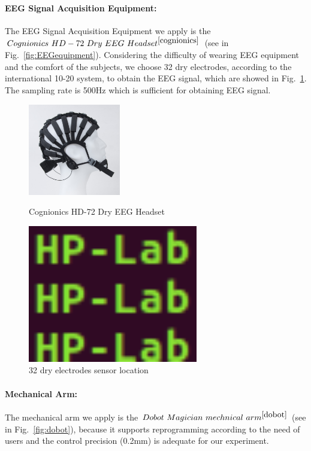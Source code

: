 \documentclass[runningheads,a4paper]{llncs}
\begin{document}
\paragraph{EEG Signal Acquisition Equipment:}
The EEG Signal Acquisition Equipment we apply is the $Cognionics\ HD-72\ Dry\ EEG
\ Headset^{\cite{cognionics}}$ (see in Fig.~\ref{fig:EEGequipment}).
Considering the difficulty of wearing EEG equipment and the comfort of the subjects,
we choose 32 dry electrodes, according to the international 10-20 system,
to obtain the EEG signal, which are showed in Fig.~\ref{fig:sensorloc}.
The sampling rate is 500Hz which is sufficient for obtaining EEG signal.
\begin{figure}
    \centering
    \includegraphics[height=4cm]{images/1}
    \caption{Cognionics HD-72 Dry EEG Headset}
    \label{fig:EEGequipment}
    \centering
    \includegraphics[height=6cm]{images/2}
    \caption{32 dry electrodes sensor location}
    \label{fig:sensorloc}
\end{figure}

\paragraph{Mechanical Arm:}
The mechanical arm we apply is the $Dobot\ Magician\ mechnical\ arm^{\cite{dobot}}$
(see in Fig.~\ref{fig:dobot}), because it supports reprogramming according to
the need of users and the control precision (0.2mm) is adequate for our experiment.
\end{document}

